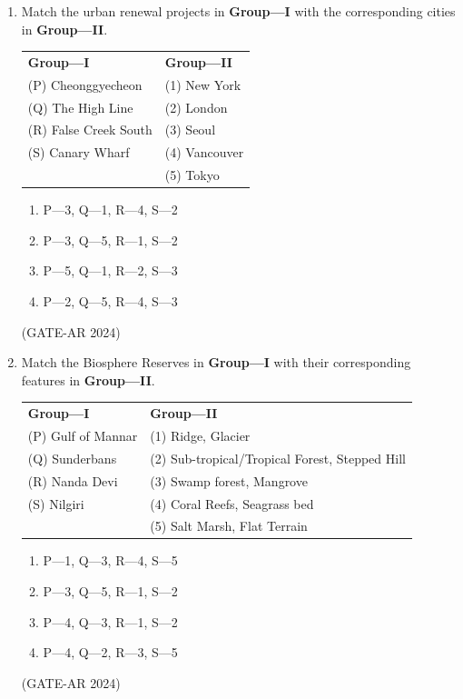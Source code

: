 \documentclass[a4paper,10pt]{article}
\begin{document}
\begin{enumerate}
    \item Match the urban renewal projects in \textbf{Group—I} with the corresponding cities in \textbf{Group—II}. \\
    \begin{tabular}{ l l }
    \textbf{Group—I} & \textbf{Group—II} \\
    (P) Cheonggyecheon & (1) New York \\
    (Q) The High Line & (2) London \\
    (R) False Creek South & (3) Seoul \\
    (S) Canary Wharf & (4) Vancouver \\
    & (5) Tokyo \\
    \end{tabular}
    \begin{multicols}{2}
    \begin{enumerate}
        \item P—3, Q—1, R—4, S—2
        \item P—3, Q—5, R—1, S—2
        \item P—5, Q—1, R—2, S—3
        \item P—2, Q—5, R—4, S—3
    \end{enumerate}
    \end{multicols}
    \hfill (GATE-AR 2024)

    \item Match the Biosphere Reserves in \textbf{Group—I} with their corresponding features in \textbf{Group—II}. \\
    \begin{tabular}{ l l }
    \textbf{Group—I} & \textbf{Group—II} \\
    (P) Gulf of Mannar & (1) Ridge, Glacier \\
    (Q) Sunderbans & (2) Sub-tropical/Tropical Forest, Stepped Hill \\
    (R) Nanda Devi & (3) Swamp forest, Mangrove \\
    (S) Nilgiri & (4) Coral Reefs, Seagrass bed \\
    & (5) Salt Marsh, Flat Terrain \\
    \end{tabular}
    \begin{multicols}{2}
    \begin{enumerate}
        \item P—1, Q—3, R—4, S—5
        \item P—3, Q—5, R—1, S—2
        \item P—4, Q—3, R—1, S—2
        \item P—4, Q—2, R—3, S—5
    \end{enumerate}
    \end{multicols}
    \hfill (GATE-AR 2024)


\end{enumerate}
\end{document}
